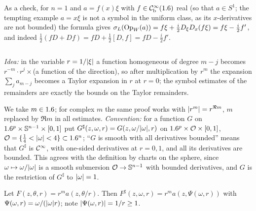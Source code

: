 As a check, for $n=1$ and $a=f(x)\xi$ with $f\in\mathcal{C}^\infty_{\mathrm{b}}(1.6)$ real (so that $a\in S^1$;
the tempting example $a=x\xi$ is not a symbol in the uniform class, as its
$x$-derivatives are not bounded) the formula gives
$\sigma_L(\operatorname{Op}_W(a))=f\xi+\frac i2D_\xi D_x(f\xi)=f\xi-\frac i2f'$, and indeed
$\frac12(fD+Df)=fD+\frac12[D,f]=fD-\frac i2f'$.

\subsection*{}

\emph{Idea:} in the variable $r=1/\lvert \xi\rvert$ a function homogeneous of degree $m-j$ becomes
$r^{-m}\cdot r^j\times$(a function of the direction), so after multiplication by $r^m$
the expansion $\sum_ja_{m-j}$ becomes a Taylor expansion in $r$ at $r=0$; the symbol
estimates of the remainders are exactly the bounds on the Taylor remainders.

We take $m\in1.6$; for complex $m$ the same proof works with $\lvert r^m\rvert=r^{\Re m}$, $m$
replaced by $\Re m$ in all estimates. \emph{Convention:} for a function $G$ on
$1.6^p\times\mathbb{S}^{n-1}\times[0,1]$ put $G^\sharp(z,\omega,r)=G(z,\omega/\lvert \omega\rvert,r)$ on
$1.6^p\times\mathcal O\times[0,1]$, $\mathcal O=\{\frac14<\lvert \omega\rvert<4\}\subset1.6^n$; ``$G$ is
smooth with all derivatives bounded'' means that $G^\sharp$ is $\mathcal{C}^\infty$, with one-sided
derivatives at $r=0,1$, and all its derivatives are bounded. This agrees with the
definition by charts on the sphere, since $\omega\mapsto\omega/\lvert \omega\rvert$ is a smooth
submersion $\mathcal O\to\mathbb{S}^{n-1}$ with bounded derivatives, and $G$ is the restriction of
$G^\sharp$ to $\lvert \omega\rvert=1$.

Let $F(z,\theta,r)=r^ma(z,\theta/r)$. Then $F^\sharp(z,\omega,r)=r^ma(z,\Psi(\omega,r))$
with $\Psi(\omega,r)=\omega/(\lvert \omega\rvert r)$; note $\lvert \Psi(\omega,r)\rvert=1/r\ge1$.

